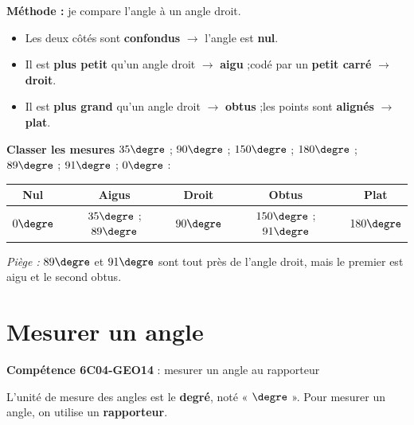 \documentclass[11pt]{article}
\newcommand{\comp}[2]{\par\smallskip\noindent\colorbox{gray!15}{\parbox{\dimexpr\linewidth-2\fboxsep}{\small\textbf{Compétence #1} : #2}}\par\smallskip}
\begin{document}
\begin{exercice}
\textbf{Méthode :} je compare l'angle à un angle droit.
\begin{itemize}
\item Les deux côtés sont \textbf{confondus} $\to$ l'angle est \textbf{nul}.
\item Il est \textbf{plus petit} qu'un angle droit $\to$ \textbf{aigu} ;\quad codé par un \textbf{petit carré} $\to$ \textbf{droit}.
\item Il est \textbf{plus grand} qu'un angle droit $\to$ \textbf{obtus} ;\quad les points sont \textbf{alignés} $\to$ \textbf{plat}.
\end{itemize}
\textbf{Classer les mesures} $35\degre$ ; $90\degre$ ; $150\degre$ ; $180\degre$ ; $89\degre$ ; $91\degre$ ; $0\degre$ :
\begin{center}
\renewcommand{\arraystretch}{1.3}
\begin{tabular}{|c|c|c|c|c|}
\hline
\textbf{Nul} & \textbf{Aigus} & \textbf{Droit} & \textbf{Obtus} & \textbf{Plat} \\ \hline
$0\degre$ & $35\degre$ ; $89\degre$ & $90\degre$ & $150\degre$ ; $91\degre$ & $180\degre$ \\ \hline
\end{tabular}
\end{center}
\textit{Piège :} $89\degre$ et $91\degre$ sont tout près de l'angle droit, mais le premier est aigu et le second obtus.
\end{exercice}

\newpage
\section{Mesurer un angle}
\comp{6C04-GEO14}{mesurer un angle au rapporteur}

\begin{definition}
L'unité de mesure des angles est le \textbf{degré}, noté « $\degre$ ».
Pour mesurer un angle, on utilise un \textbf{rapporteur}.
\end{definition}
\end{document}
